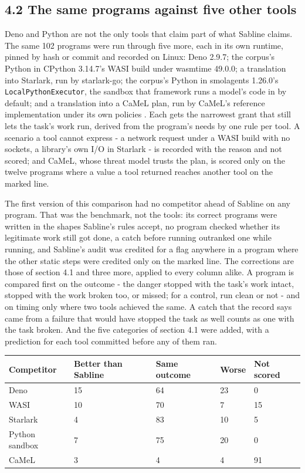\documentclass[
]{article}
\newcounter{none} %
\begin{document}
\subsection{4.2 The same programs against five other
tools}\label{the-same-programs-against-five-other-tools}

Deno and Python are not the only tools that claim part of what Sabline
claims. The same 102 programs were run through five more, each in its
own runtime, pinned by hash or commit and recorded on Linux: Deno 2.9.7;
the corpus's Python in CPython 3.14.7's WASI build under wasmtime
49.0.0; a translation into Starlark, run by starlark-go; the corpus's
Python in smolagents 1.26.0's \texttt{LocalPythonExecutor}, the sandbox
that framework runs a model's code in by default; and a translation into
a CaMeL plan, run by CaMeL's reference implementation under its own
policies \citep{debenedetti2025camel}. Each gets the narrowest grant
that still lets the task's work run, derived from the program's needs by
one rule per tool. A scenario a tool cannot express - a network request
under a WASI build with no sockets, a library's own I/O in Starlark - is
recorded with the reason and not scored; and CaMeL, whose threat model
trusts the plan, is scored only on the twelve programs where a value a
tool returned reaches another tool on the marked line.

The first version of this comparison had no competitor ahead of Sabline
on any program. That was the benchmark, not the tools: its correct
programs were written in the shapes Sabline's rules accept, no program
checked whether its legitimate work still got done, a catch before
running outranked one while running, and Sabline's audit was credited
for a flag anywhere in a program where the other static steps were
credited only on the marked line. The corrections are those of section
4.1 and three more, applied to every column alike. A program is compared
first on the outcome - the danger stopped with the task's work intact,
stopped with the work broken too, or missed; for a control, run clean or
not - and on timing only where two tools achieved the same. A catch that
the record says came from a failure that would have stopped the task as
well counts as one with the task broken. And the five categories of
section 4.1 were added, with a prediction for each tool committed before
any of them ran.

{\def\LTcaptype{none} %
\begin{longtable}[]{@{}lllll@{}}
\toprule\noalign{}
Competitor & Better than Sabline & Same outcome & Worse & Not scored \\
\midrule\noalign{}
\endhead
\bottomrule\noalign{}
\endlastfoot
Deno & 15 & 64 & 23 & 0 \\
WASI & 10 & 70 & 7 & 15 \\
Starlark & 4 & 83 & 10 & 5 \\
Python sandbox & 7 & 75 & 20 & 0 \\
CaMeL & 3 & 4 & 4 & 91 \\
\end{longtable}
}
\end{document}
